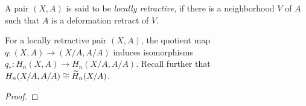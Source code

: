 \begin{definition}
    A pair $(X, A)$ is said to be \emph{locally retractive}, if there is a neighborhood $V$ of $A$ such that $A$ is a deformation retract of $V$.
\end{definition}

\begin{lemma}
    For a locally retractive pair $(X, A)$, the quotient map $q: (X, A)\to(X/A, A/A)$ induces isomorphisms $q_\ast: H_n(X, A)\to H_n(X/A, A/A)$. Recall further that $H_n(X/A, A/A)\cong\widetilde{H}_n(X/A)$.
\end{lemma}
\begin{proof}
    
\end{proof}